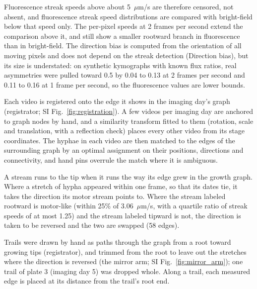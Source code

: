 Fluorescence streak speeds above about 5~$\mu$m/s are therefore censored, not absent, and fluorescence streak speed distributions are compared with bright-field below that speed only.
The per-pixel speeds at 2 frames per second extend the comparison above it, and still show a smaller rootward branch in fluorescence than in bright-field.
The direction bias is computed from the orientation of all moving pixels and does not depend on the streak detection (Direction bias), but its size is understated: on synthetic kymographs with known flux ratios, real asymmetries were pulled toward 0.5 by 0.04 to 0.13 at 2 frames per second and 0.11 to 0.16 at 1 frame per second, so the fluorescence values are lower bounds.


Each video is registered onto the edge it shows in the imaging day's graph (registrator; SI Fig.~\ref{fig:registration}).
A few videos per imaging day are anchored to graph nodes by hand, and a similarity transform fitted to them (rotation, scale and translation, with a reflection check) places every other video from its stage coordinates.
The hyphae in each video are then matched to the edges of the surrounding graph by an optimal assignment on their positions, directions and connectivity, and hand pins overrule the match where it is ambiguous.

A stream runs to the tip when it runs the way its edge grew in the growth graph.
Where a stretch of hypha appeared within one frame, so that its dates tie, it takes the direction its motor stream points to.
Where the stream labeled rootward is motor-like (within 25\% of 3.06~$\mu$m/s, with a quartile ratio of streak speeds of at most 1.25) and the stream labeled tipward is not, the direction is taken to be reversed and the two are swapped (58 edges).


Trails were drawn by hand as paths through the graph from a root toward growing tips (registrator), and trimmed from the root to leave out the stretches where the direction is reversed (the mirror arm; SI Fig.~\ref{fig:mirror_arm}); one trail of plate 3 (imaging day 5) was dropped whole.
Along a trail, each measured edge is placed at its distance from the trail's root end.

